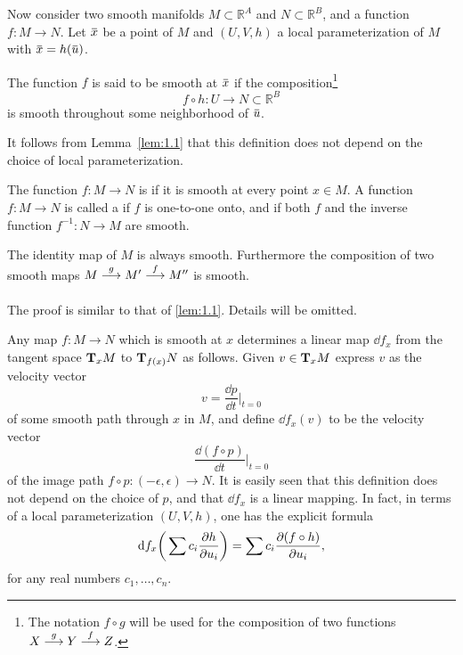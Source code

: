 \documentclass[../main]{subfiles}
\begin{document}
Now consider two smooth manifolds $M \subset {\mathbb R}^A$ and $N \subset {\mathbb R}^B$, and a function $f : M \longrightarrow N$. Let $\xoverline x$ be a point of $M$ and $(U, V, h)$ a local parameterization of $M$ with $\xoverline x = h(\xoverline u)$.

\begin{definition}
The function $f$ is said to be smooth at $\xoverline x$ if the composition\footnote{The notation $f \circ g$ will be used for the composition of two functions $X \varrightarrow{g} Y \varrightarrow{f} Z$.} \[f \circ h : U \longrightarrow N \subset {\mathbb R}^B\] is smooth throughout some neighborhood of $\xoverline u$. 
\end{definition} 

It follows from Lemma~\ref{lem:1.1} that this definition does not depend on the choice of local parameterization. 

\begin{definition}
The function $f : M \longrightarrow N$ is  if it is smooth at every point $x \in M$. A function $f : M \longrightarrow N$ is called a  if $f$ is one-to-one onto, and if both $f$ and the inverse function $f^{-1} : N \longrightarrow M$ are smooth. 
\end{definition}

\begin{lemma}
\label{lem:1.3}
The identity map of $M$ is always smooth. Furthermore the composition of two smooth maps $M \varrightarrow{g} M' \varrightarrow{f} M''$ is smooth.
\end{lemma}

The proof is similar to that of \ref{lem:1.1}. Details will be omitted. 

Any map $f : M \longrightarrow N$ which is smooth at $x$ determines a linear map $\dd f_x$ from the tangent space $\tangentspace M x$ to $\tangentspace N {f(x)}$ as follows. Given $v \in \tangentspace M x$ express $v$ as the velocity vector \[v = \dfrac{\dd p}{\dd t} \Big|_{t = 0}\] of some smooth path through $x$ in $M$, and define $\dd f_x(v)$ to be the velocity vector \[\dfrac{\dd(f \circ p)}{\dd t} \Big|_{t = 0}\] of the image path $f \circ p : (-\epsilon, \epsilon) \longrightarrow N$. It is easily seen that this definition does not depend on the choice of $p$, and that $\dd f_x$ is a linear mapping. In fact, in terms of a local parameterization $(U, V, h)$, one has the explicit formula \[\differential f x \bigg(\sum c_i\dfrac{\partial h}{\partial u_i}\bigg) = \sum c_i \dfrac{\partial (f \circ h)}{\partial u_i},\] for any real numbers $c_1, \ldots, c_n$. 
\end{document}
